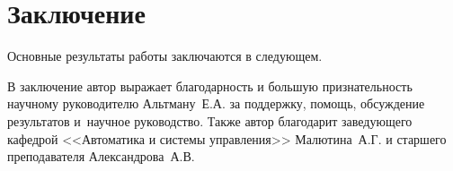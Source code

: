 \chapter*{Заключение}                       %


Основные результаты работы заключаются в следующем.
%

В заключение автор
выражает благодарность и большую признательность научному руководителю
Альтману~Е.\:А. за поддержку, помощь, обсуждение результатов и~научное
руководство. Также автор благодарит заведующего кафедрой <<Автоматика и системы управления>> Малютина~А.\:Г. и старшего преподавателя Александрова~А.\:В.

